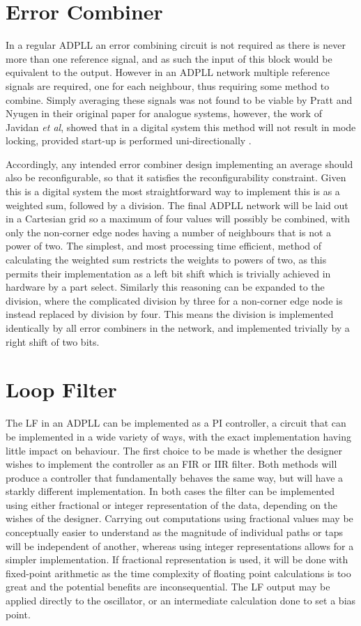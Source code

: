 \section{Error Combiner}
In a regular \ac{ADPLL} an error combining circuit is not required as there is never more than one reference signal, and as such the input of this block would be equivalent to the output. However in an \ac{ADPLL} network multiple reference signals are required, one for each neighbour, thus requiring some method to combine. Simply averaging these signals was not found to be viable by Pratt and Nyugen in their original paper for analogue systems, however, the work of Javidan \textit{et al}, showed that in a digital system this method will not result in mode locking, provided start-up is performed uni-directionally \cite{javidan2011all}.

Accordingly, any intended error combiner design implementing an average should also be reconfigurable, so that it satisfies the reconfigurability constraint. Given this is a digital system the most straightforward way to implement this is as a weighted sum, followed by a division. The final \ac{ADPLL} network will be laid out in a Cartesian grid so a maximum of four values will possibly be combined, with only the non-corner edge nodes having a number of neighbours that is not a power of two.
The simplest, and most processing time efficient, method of calculating the weighted sum restricts the weights to powers of two, as this permits their implementation as a left bit shift which is trivially achieved in hardware by a part select.
Similarly this reasoning can be expanded to the division, where the complicated division by three for a non-corner edge node is instead replaced by division by four. This means the division is implemented identically by all error combiners in the network, and implemented trivially by a right shift of two bits.%

\section{Loop Filter}
The \acl{LF} in an \ac{ADPLL} can be implemented as a \ac{PI} controller, a circuit that can be implemented in a wide variety of ways, with the exact implementation having little impact on behaviour. The first choice to be made is whether the designer wishes to implement the controller as an \ac{FIR} or \ac{IIR} filter. Both methods will produce a controller that fundamentally behaves the same way, but will have a starkly different implementation. In both cases the filter can be implemented using either fractional or integer representation of the data, depending on the wishes of the designer. Carrying out computations using fractional values may be conceptually easier to understand as the magnitude of individual paths or taps will be independent of another, whereas using integer representations allows for a simpler implementation. If fractional representation is used, it will be done with fixed-point arithmetic as the time complexity of floating point calculations is too great and the potential benefits are inconsequential. The \acl{LF} output may be applied directly to the oscillator, or an intermediate calculation done to set a bias point.

